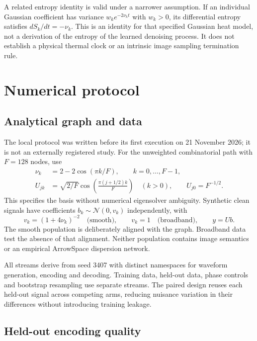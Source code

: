 \documentclass[10pt]{article}
\begin{document}
A related entropy identity is valid under a narrower assumption.
If an individual Gaussian coefficient has variance
$w_ke^{-2\nu_k t}$ with $w_k>0$, its differential entropy satisfies
$dS_k/dt=-\nu_k$. This is an identity for that specified Gaussian heat
model, not a derivation of the entropy of the learned denoising process.
It does not establish a physical thermal clock or an intrinsic image
sampling termination rule.

\section{Numerical protocol}
\label{sec:protocol}

\subsection{Analytical graph and data}

The local protocol was written before its first execution on
21 November 2026; it is not an externally registered study.
For the unweighted combinatorial path with $F=128$ nodes, use
\begin{align}
 \nu_k&=2-2\cos(\pi k/F),\qquad k=0,\ldots,F-1,\\
 U_{jk}&=\sqrt{2/F}\cos\!\left(\frac{\pi(j+1/2)k}{F}\right)
 \quad (k>0),\qquad U_{j0}=F^{-1/2}.
 \label{eq:path}
\end{align}
This specifies the basis without numerical eigensolver ambiguity.
Synthetic clean signals have coefficients
$b_k\sim\mathcal N(0,v_k)$ independently, with
\begin{equation}
 v_k=(1+4\nu_k)^{-2}\quad\text{(smooth)},\qquad
 v_k=1\quad\text{(broadband)},\qquad y=Ub.
 \label{eq:populations}
\end{equation}
The smooth population is deliberately aligned with the graph.
Broadband data test the absence of that alignment. Neither population
contains image semantics or an empirical ArrowSpace dispersion network.

All streams derive from seed 3407 with distinct namespaces for waveform
generation, encoding and decoding. Training data, held-out data, phase
controls and bootstrap resampling use separate streams. The paired design
reuses each held-out signal across competing arms, reducing nuisance
variation in their differences without introducing training leakage.

\subsection{Held-out encoding quality}
\end{document}

